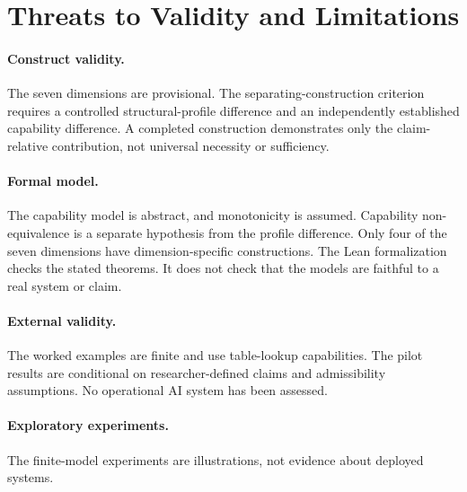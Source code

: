 \section{Threats to Validity and Limitations}
\label{aa.sec.threats}

\paragraph{Construct validity.}
The seven dimensions are provisional.
The separating-construction criterion requires a controlled
structural-profile difference and an independently established
capability difference.
A completed construction demonstrates only the claim-relative contribution,
not universal necessity or sufficiency.

\paragraph{Formal model.}
The capability model is abstract, and monotonicity is assumed.
Capability non-equivalence is a separate hypothesis from the profile difference.
Only four of the seven dimensions have dimension-specific constructions.
The Lean formalization checks the stated theorems.
It does not check that the models are faithful to a real system or claim.

\paragraph{External validity.}
The worked examples are finite and use table-lookup capabilities.
The pilot results are conditional on researcher-defined claims and admissibility assumptions.
No operational AI system has been assessed.

\paragraph{Exploratory experiments.}
The finite-model experiments are illustrations, not evidence about deployed systems.
